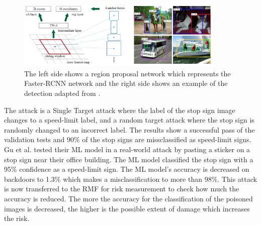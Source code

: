 \begin{figure}[ht!]
  \centering
  \includegraphics[width=10cm]{pictures/f_rcnn.jpg}
  \caption{The left side shows a region proposal network which represents the Faster-RCNN network and the right side shows an example of the detection adapted from \cite{DBLP:conf/nips/RenHGS15}.}
  \label{fig:f_rcnn}
\end{figure}

The attack is a Single Target attack where the label of the stop sign image changes to a speed-limit label, and a random target attack where the stop sign is randomly changed to an incorrect label. The results show a successful pass of the validation tests and 90\% of the stop signs are missclassified as speed-limit signs. Gu et al. tested their ML model in a real-world attack by pasting a sticker on a stop sign near their office building. The ML model classified the stop sign with a 95\% confidence as a speed-limit sign. The ML model's accuracy is decreased on backdoors to 1.3\% which makes a misclassification to more than 98\%. This attack is now transferred to the RMF for risk measurement to check how much the accuracy is reduced. The more the accuracy for the classification of the poisoned images is decreased, the higher is the possible extent of damage which increases the risk. \\ \\

